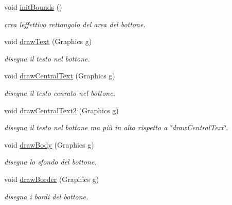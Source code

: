 \begin{DoxyCompactItemize}
\item 
void \hyperlink{classui_1_1_my_button_a4d3160e53a5224ffdf578694846b19b3}{init\+Bounds} ()
\begin{DoxyCompactList}\small\item\em crea l\textquotesingle{}effettivo rettangolo del area del bottone. \end{DoxyCompactList}\item 
void \hyperlink{classui_1_1_my_button_a8df311009317d839a01870ceac76eb75}{draw\+Text} (Graphics g)
\begin{DoxyCompactList}\small\item\em disegna il testo nel bottone. \end{DoxyCompactList}\item 
void \hyperlink{classui_1_1_my_button_a3a4d8b054f65915e3b9bfafe4228ad06}{draw\+Central\+Text} (Graphics g)
\begin{DoxyCompactList}\small\item\em disegna il testo cenrato nel bottone. \end{DoxyCompactList}\item 
void \hyperlink{classui_1_1_my_button_a5d567e88f76d588ff4af3357a5db4f9c}{draw\+Central\+Text2} (Graphics g)
\begin{DoxyCompactList}\small\item\em disegna il testo nel bottone ma più in alto rispetto a \char`\"{}draw\+Central\+Text\char`\"{}. \end{DoxyCompactList}\item 
void \hyperlink{classui_1_1_my_button_a1e330b5600a9187ca0ef7f964cfb24c9}{draw\+Body} (Graphics g)
\begin{DoxyCompactList}\small\item\em disegna lo sfondo del bottone. \end{DoxyCompactList}\item 
void \hyperlink{classui_1_1_my_button_af91752554b78073a295ed441afc34638}{draw\+Border} (Graphics g)
\begin{DoxyCompactList}\small\item\em disegna i bordi del bottone. \end{DoxyCompactList}\end{DoxyCompactItemize}
